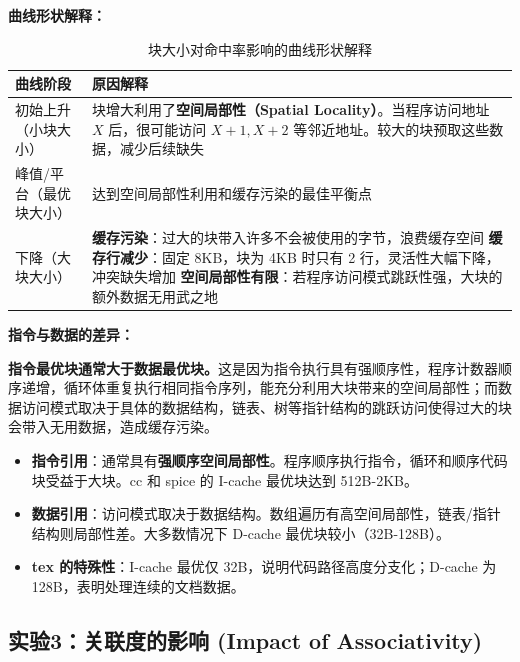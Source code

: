 \documentclass[12pt,a4paper]{article}
\begin{document}
\textbf{曲线形状解释：}

\begin{table}[H]
\centering
\small
\caption{块大小对命中率影响的曲线形状解释}
\begin{tabular}{p{3.5cm}p{11cm}}
\toprule
\textbf{曲线阶段} & \textbf{原因解释} \\
\midrule
初始上升（小块大小） & 块增大利用了\textbf{空间局部性（Spatial Locality）}。当程序访问地址 $X$ 后，很可能访问 $X+1, X+2$ 等邻近地址。较大的块预取这些数据，减少后续缺失 \\
\midrule
峰值/平台（最优块大小） & 达到空间局部性利用和缓存污染的最佳平衡点 \\
\midrule
下降（大块大小） & \textbf{缓存污染}：过大的块带入许多不会被使用的字节，浪费缓存空间\newline
\textbf{缓存行减少}：固定 8KB，块为 4KB 时只有 2 行，灵活性大幅下降，冲突缺失增加\newline
\textbf{空间局部性有限}：若程序访问模式跳跃性强，大块的额外数据无用武之地 \\
\bottomrule
\end{tabular}
\end{table}

\textbf{指令与数据的差异：}

\textbf{指令最优块通常大于数据最优块。}这是因为指令执行具有强顺序性，程序计数器顺序递增，循环体重复执行相同指令序列，能充分利用大块带来的空间局部性；而数据访问模式取决于具体的数据结构，链表、树等指针结构的跳跃访问使得过大的块会带入无用数据，造成缓存污染。

\begin{itemize}
    \item \textbf{指令引用}：通常具有\textbf{强顺序空间局部性}。程序顺序执行指令，循环和顺序代码块受益于大块。cc 和 spice 的 I-cache 最优块达到 512B-2KB。
    
    \item \textbf{数据引用}：访问模式取决于数据结构。数组遍历有高空间局部性，链表/指针结构则局部性差。大多数情况下 D-cache 最优块较小（32B-128B）。
    
    \item \textbf{tex 的特殊性}：I-cache 最优仅 32B，说明代码路径高度分支化；D-cache 为 128B，表明处理连续的文档数据。
\end{itemize}
\subsection{实验3：关联度的影响 (Impact of Associativity)}
\end{document}
